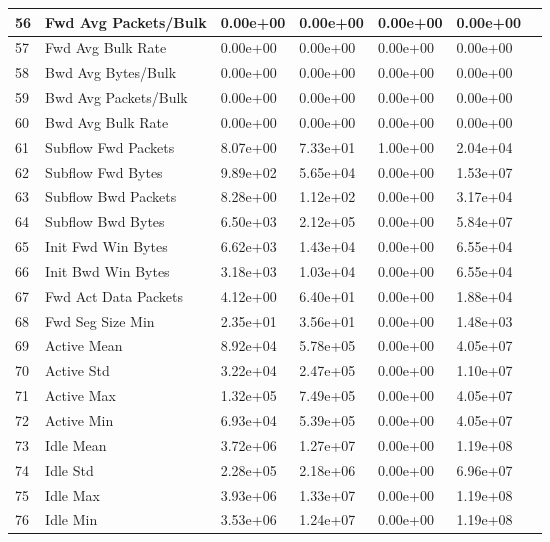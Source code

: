 \begin{center}
\begin{longtable}{|l|l|l|l|l|l|l|}
        \hline
        56 & Fwd Avg Packets/Bulk & 0.00e+00 & 0.00e+00 & 0.00e+00 & 0.00e+00 \\
        \hline
        57 & Fwd Avg Bulk Rate & 0.00e+00 & 0.00e+00 & 0.00e+00 & 0.00e+00 \\
        \hline
        58 & Bwd Avg Bytes/Bulk & 0.00e+00 & 0.00e+00 & 0.00e+00 & 0.00e+00 \\
        \hline
        59 & Bwd Avg Packets/Bulk & 0.00e+00 & 0.00e+00 & 0.00e+00 & 0.00e+00 \\
        \hline
        60 & Bwd Avg Bulk Rate & 0.00e+00 & 0.00e+00 & 0.00e+00 & 0.00e+00 \\
        \hline
        61 & Subflow Fwd Packets & 8.07e+00 & 7.33e+01 & 1.00e+00 & 2.04e+04 \\
        \hline
        62 & Subflow Fwd Bytes & 9.89e+02 & 5.65e+04 & 0.00e+00 & 1.53e+07 \\
        \hline
        63 & Subflow Bwd Packets & 8.28e+00 & 1.12e+02 & 0.00e+00 & 3.17e+04 \\
        \hline
        64 & Subflow Bwd Bytes & 6.50e+03 & 2.12e+05 & 0.00e+00 & 5.84e+07 \\
        \hline
        65 & Init Fwd Win Bytes & 6.62e+03 & 1.43e+04 & 0.00e+00 & 6.55e+04 \\
        \hline
        66 & Init Bwd Win Bytes & 3.18e+03 & 1.03e+04 & 0.00e+00 & 6.55e+04 \\
        \hline
        67 & Fwd Act Data Packets & 4.12e+00 & 6.40e+01 & 0.00e+00 & 1.88e+04 \\
        \hline
        68 & Fwd Seg Size Min & 2.35e+01 & 3.56e+01 & 0.00e+00 & 1.48e+03 \\
        \hline
        69 & Active Mean & 8.92e+04 & 5.78e+05 & 0.00e+00 & 4.05e+07 \\
        \hline
        70 & Active Std & 3.22e+04 & 2.47e+05 & 0.00e+00 & 1.10e+07 \\
        \hline
        71 & Active Max & 1.32e+05 & 7.49e+05 & 0.00e+00 & 4.05e+07 \\
        \hline
        72 & Active Min & 6.93e+04 & 5.39e+05 & 0.00e+00 & 4.05e+07 \\
        \hline
        73 & Idle Mean & 3.72e+06 & 1.27e+07 & 0.00e+00 & 1.19e+08 \\
        \hline
        74 & Idle Std & 2.28e+05 & 2.18e+06 & 0.00e+00 & 6.96e+07 \\
        \hline
        75 & Idle Max & 3.93e+06 & 1.33e+07 & 0.00e+00 & 1.19e+08 \\
        \hline
        76 & Idle Min & 3.53e+06 & 1.24e+07 & 0.00e+00 & 1.19e+08 \\
        \hline
    \end{longtable}
\end{center}


